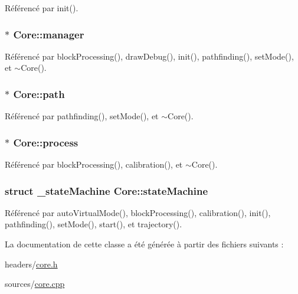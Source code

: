 Référencé par init().

\hypertarget{classCore_a834f8de7a2b8f18b19af83d6c05b9b3a}{
\subsubsection[{manager}]{$\ast$ Core\-::manager\hspace{0.3cm}{\ttfamily [private]}}}\label{classCore_a834f8de7a2b8f18b19af83d6c05b9b3a}


Référencé par block\-Processing(), draw\-Debug(), init(), pathfinding(), set\-Mode(), et $\sim$\-Core().

\hypertarget{classCore_a55b925c8acc13a0002112d48a054984e}{
\subsubsection[{path}]{$\ast$ Core\-::path\hspace{0.3cm}{\ttfamily [private]}}}\label{classCore_a55b925c8acc13a0002112d48a054984e}


Référencé par pathfinding(), set\-Mode(), et $\sim$\-Core().

\hypertarget{classCore_a7a18e37fde7d3ca4b1568225b51eaf0d}{
\subsubsection[{process}]{$\ast$ Core\-::process\hspace{0.3cm}{\ttfamily [private]}}}\label{classCore_a7a18e37fde7d3ca4b1568225b51eaf0d}


Référencé par block\-Processing(), calibration(), et $\sim$\-Core().

\hypertarget{classCore_a2eaa56d6855905faec8a1764db40892b}{
\subsubsection[{state\-Machine}]{\setlength{\rightskip}{0pt plus 5cm}struct {\bf \-\_\-state\-Machine} Core\-::state\-Machine\hspace{0.3cm}{\ttfamily [private]}}}\label{classCore_a2eaa56d6855905faec8a1764db40892b}


Référencé par auto\-Virtual\-Mode(), block\-Processing(), calibration(), init(), pathfinding(), set\-Mode(), start(), et trajectory().



La documentation de cette classe a été générée à partir des fichiers suivants \-:\begin{DoxyCompactItemize}
\item 
headers/\hyperlink{core_8h}{core.\-h}\item 
sources/\hyperlink{core_8cpp}{core.\-cpp}\end{DoxyCompactItemize}
